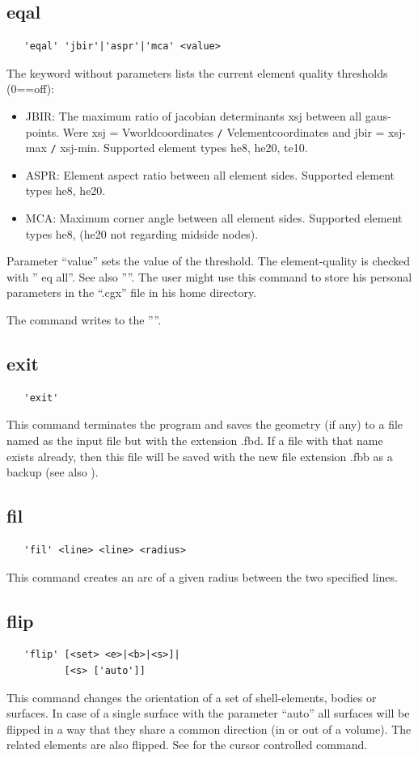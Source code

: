 \documentclass{article}
\begin{document}
\subsection{\label{eqal}eqal}
\begin{verbatim}
   'eqal' 'jbir'|'aspr'|'mca' <value>
\end{verbatim}
The keyword without parameters lists the current element quality thresholds (0==off):
\begin{itemize}
\item JBIR: The maximum ratio of jacobian determinants xsj between all gaus-points. Were xsj = Vworldcoordinates \verb_/_ Velementcoordinates and jbir = xsj-max \verb_/_ xsj-min. Supported element types he8, he20, te10.
\item ASPR: Element aspect ratio between all element sides. Supported element types he8, he20.
\item MCA: Maximum corner angle between all element sides. Supported element types he8, (he20 not regarding midside nodes).
\end{itemize}
Parameter ``value'' sets the value of the threshold. The element-quality is checked with '' eq all''. See also ''''. The user might use this command to store his personal parameters in the ``.cgx'' file in his home directory.

The command writes to the ''''.

\subsection{\label{exit}exit}
\begin{verbatim}
   'exit' 
\end{verbatim}
This command terminates the program and saves the geometry (if any) to a file named as the input file but with the extension .fbd. If a file with that name exists already, then this file will be saved with the new file extension .fbb as a backup (see also ).

\subsection{\label{fil}fil}
\begin{verbatim}
   'fil' <line> <line> <radius>
\end{verbatim}
This command creates an arc of a given radius between the two specified lines.

\subsection{\label{flip}flip}
\begin{verbatim}
   'flip' [<set> <e>|<b>|<s>]|
          [<s> ['auto']]

\end{verbatim}
This command changes the orientation of a set of shell-elements, bodies or surfaces. In case of a single surface with the parameter ``auto'' all surfaces will be flipped in a way that they share a common direction (in or out of a volume). The related elements are also flipped. See  for the cursor controlled command.
\end{document}
